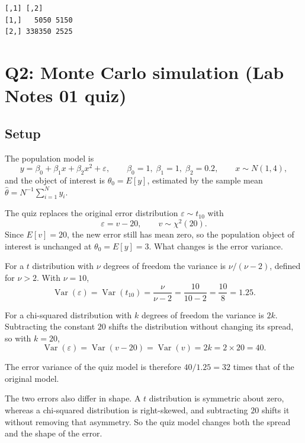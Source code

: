 \documentclass[11pt]{article}
\begin{document}
\begin{lstlisting}[style=Routput]
       [,1] [,2]
[1,]   5050 5150
[2,] 338350 2525
\end{lstlisting}

\section{Q2: Monte Carlo simulation (Lab Notes 01 quiz)}
\label{sec:q2}

\subsection{Setup}

The population model is
\[
y = \beta_0 + \beta_1 x + \beta_2 x^2 + \varepsilon,
\qquad
\beta_0 = 1,\; \beta_1 = 1,\; \beta_2 = 0.2,
\qquad
x \sim N(1, 4),
\]
and the object of interest is $\theta_0 = E[y]$, estimated by the sample mean
$\hat\theta = N^{-1}\sum_{i=1}^{N} y_i$.

The quiz replaces the original error distribution $\varepsilon \sim t_{10}$ with
\[
\varepsilon = v - 20, \qquad v \sim \chi^2(20).
\]
Since $E[v] = 20$, the new error still has mean zero, so the population object
of interest is unchanged at $\theta_0 = E[y] = 3$. What changes is the error
variance.

For a $t$ distribution with $\nu$ degrees of freedom the variance is
$\nu / (\nu - 2)$, defined for $\nu > 2$. With $\nu = 10$,
\[
\operatorname{Var}(\varepsilon) = \operatorname{Var}(t_{10})
 = \frac{\nu}{\nu - 2} = \frac{10}{10 - 2} = \frac{10}{8} = 1.25 .
\]

For a chi-squared distribution with $k$ degrees of freedom the variance is
$2k$. Subtracting the constant $20$ shifts the distribution without changing
its spread, so with $k = 20$,
\[
\operatorname{Var}(\varepsilon) = \operatorname{Var}(v - 20)
 = \operatorname{Var}(v) = 2k = 2 \times 20 = 40 .
\]

The error variance of the quiz model is therefore $40 / 1.25 = 32$ times that
of the original model.

The two errors also differ in shape. A $t$ distribution is symmetric about
zero, whereas a chi-squared distribution is right-skewed, and subtracting $20$
shifts it without removing that asymmetry. So the quiz model changes both the
spread and the shape of the error.
\end{document}
